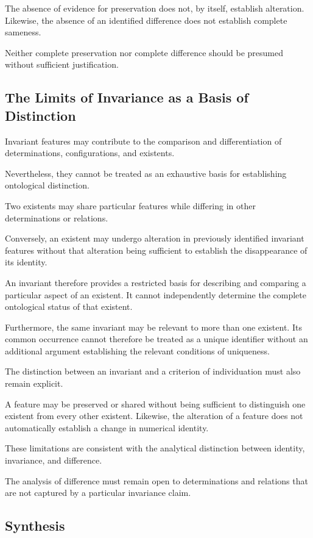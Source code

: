 The absence of evidence for preservation
does not, by itself, establish alteration.
Likewise, the absence of an identified
difference does not establish complete
sameness.

Neither complete preservation nor
complete difference should be presumed
without sufficient justification.

\subsection{The Limits of Invariance as a Basis of Distinction}

Invariant features may contribute to
the comparison and differentiation of
determinations, configurations, and
existents.

Nevertheless, they cannot be treated
as an exhaustive basis for establishing
ontological distinction.

Two existents may share particular
features while differing in other
determinations or relations.

Conversely, an existent may undergo
alteration in previously identified
invariant features without that alteration
being sufficient to establish the
disappearance of its identity.

An invariant therefore provides a
restricted basis for describing and
comparing a particular aspect of an
existent. It cannot independently
determine the complete ontological
status of that existent.

Furthermore, the same invariant may
be relevant to more than one existent.
Its common occurrence cannot therefore
be treated as a unique identifier
without an additional argument
establishing the relevant conditions
of uniqueness.

The distinction between an invariant
and a criterion of individuation must
also remain explicit.

A feature may be preserved or shared
without being sufficient to distinguish
one existent from every other existent.
Likewise, the alteration of a feature
does not automatically establish
a change in numerical identity.

These limitations are consistent with
the analytical distinction between
identity, invariance, and difference.

The analysis of difference must remain
open to determinations and relations
that are not captured by a particular
invariance claim.

\subsection{Synthesis}

